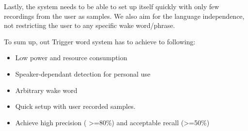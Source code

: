    Lastly, the system needs to be able to set up itself quickly with only few recordings from the user as samples. We also aim for the language independence, not restricting the user to any specific wake word/phrase.

    To sum up, out Trigger word system has to achieve to  following:
    \begin{itemize}
        \item Low power and resource consumption
        \item Speaker-dependant detection for personal use
        \item Arbitrary wake word
        \item Quick setup with user recorded samples.
        \item Achieve high precision ( >=80\%) and acceptable recall (>=50\%)
    \end{itemize}
